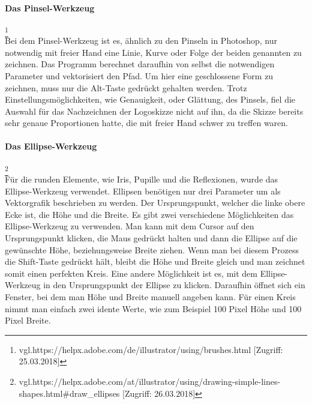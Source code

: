 \paragraph{Das Pinsel-Werkzeug}
\footnote{\label{} vgl.https://helpx.adobe.com/de/illustrator/using/brushes.html [Zugriff: 25.03.2018]}
\leavevmode \\
Bei dem Pinsel-Werkzeug ist es, ähnlich zu den Pinseln in Photoshop, nur notwendig mit freier Hand eine Linie, Kurve oder Folge der beiden genannten zu zeichnen. Das Programm berechnet daraufhin von selbst die notwendigen Parameter und vektorisiert den Pfad. Um hier eine geschlossene Form zu zeichnen, muss nur die Alt-Taste gedrückt gehalten werden. Trotz Einstellungsmöglichkeiten, wie Genauigkeit, oder Glättung, des Pinsels, fiel die Auswahl für das Nachzeichnen der Logoskizze nicht auf ihn, da die Skizze bereits sehr genaue Proportionen hatte, die mit freier Hand schwer zu treffen waren.
\leavevmode \\

\paragraph{Das Ellipse-Werkzeug}
\footnote{\label{} vgl.https://helpx.adobe.com/at/illustrator/using/drawing-simple-lines-shapes.html\#draw\_ellipses [Zugriff: 26.03.2018]}
\leavevmode \\
Für die runden Elemente, wie Iris, Pupille und die Reflexionen, wurde das Ellipse-Werkzeug verwendet. Ellipsen benötigen nur drei Parameter um als Vektorgrafik beschrieben zu werden. Der Ursprungspunkt, welcher die linke obere Ecke ist, die Höhe und die Breite. Es gibt zwei verschiedene Möglichkeiten das Ellipse-Werkzeug zu verwenden. Man kann mit dem Cursor auf den Ursprungspunkt klicken, die Maus gedrückt halten und dann die Ellipse auf die gewünschte Höhe, beziehungsweise Breite ziehen. Wenn man bei diesem Prozess die Shift-Taste gedrückt hält, bleibt die Höhe und Breite gleich und man zeichnet somit einen perfekten Kreis. Eine andere Möglichkeit ist es, mit dem Ellipse-Werkzeug in den Ursprungspunkt der Ellipse zu klicken. Daraufhin öffnet sich ein Fenster, bei dem man Höhe und Breite manuell angeben kann. Für einen Kreis nimmt man einfach zwei idente Werte, wie zum Beispiel 100 Pixel Höhe und 100 Pixel Breite.
\leavevmode \\

